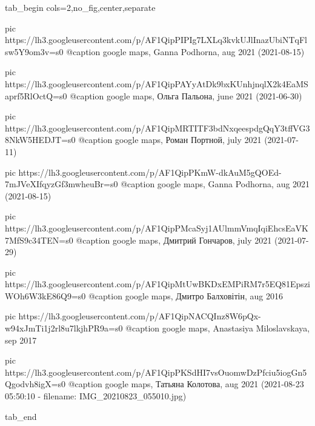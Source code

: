  
 
 
 
 


\ifcmt
  tab_begin cols=2,no_fig,center,separate

		pic https://lh3.googleusercontent.com/p/AF1QipPIPIg7LXLq3kvkUJlInazUbiNTqFlsw5Y9om3v=s0
		@caption google maps, Ganna Podhorna, aug 2021 (2021-08-15)

		pic https://lh3.googleusercontent.com/p/AF1QipPAYyAtDk9bxKUnhjnqlX2k4EaMSaprf5RlOctQ=s0
		@caption google maps, Ольга Пальона, june 2021 (2021-06-30)

		pic https://lh3.googleusercontent.com/p/AF1QipMRTITF3bdNxqeespdgQqY3tffVG38NkW5HEDJT=s0
		@caption google maps, Роман Портной, july 2021 (2021-07-11)

		pic https://lh3.googleusercontent.com/p/AF1QipPKmW-dkAuM5gQOEd-7mJVeXIfqyzGf3mwheuBr=s0
		@caption google maps, Ganna Podhorna, aug 2021 (2021-08-15)

		pic https://lh3.googleusercontent.com/p/AF1QipPMcaSyj1AUlmmVmqIqiEhcsEaVK7MfS9c34TEN=s0
		@caption google maps, Дмитрий Гончаров, july 2021 (2021-07-29)

		pic https://lh3.googleusercontent.com/p/AF1QipMtUwBKDxEMPiRM7r5EQ81EpsziWOh6W3kE86Q9=s0
		@caption google maps, Дмитро Балховітін, aug 2016 

		pic https://lh3.googleusercontent.com/p/AF1QipNACQInz8W6pQx-w94xJmTi1j2rl8u7lkjhPR9a=s0
		@caption google maps, Anastasiya Miloslavskaya, sep 2017

		pic https://lh3.googleusercontent.com/p/AF1QipPKSdHI7vsOuomwDzPfciu5iogGn5Qgodvh8igX=s0
		@caption google maps, Татьяна Колотова, aug 2021 (2021-08-23 05:50:10 - filename: IMG_20210823_055010.jpg)

  tab_end
\fi
